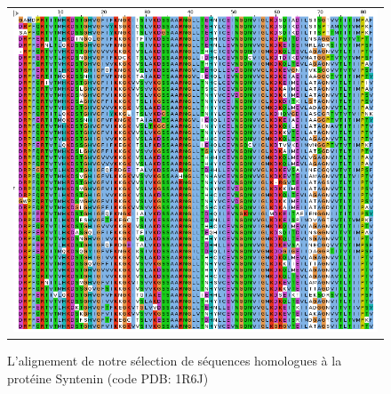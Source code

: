   \begin{figure}[t]
     \centering
     \begin{tabular}{c}
       \includegraphics[width=17cm]{homologues/1R6J.png} \\
     \end{tabular}
     \caption{L'alignement de notre sélection de séquences homologues à la protéine Syntenin (code PDB: 1R6J)}
\label{align_homo:Syntenin}
   \end{figure}

